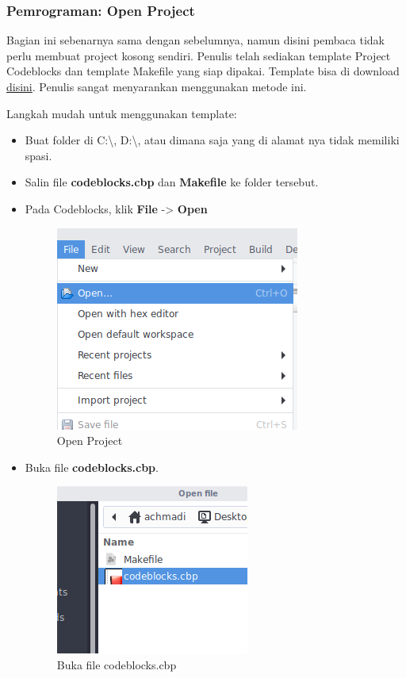 \documentclass[12pt,]{article}
\begin{document}
	\newpage
	\subsubsection{Pemrograman: Open Project}
	
	Bagian ini sebenarnya sama dengan sebelumnya, namun disini pembaca tidak perlu membuat project kosong sendiri.
	Penulis telah sediakan template Project Codeblocks dan template Makefile yang siap dipakai.
	Template bisa di download \href{https://github.com/mekatronik-achmadi/atmega-demos/tree/master/template/codeblocks/}{disini}.
	Penulis sangat menyarankan menggunakan metode ini.
	
	Langkah mudah untuk menggunakan template:
	\begin{itemize}
		\item Buat folder di C:\textbackslash, D:\textbackslash, atau dimana saja yang di alamat nya tidak memiliki spasi.
		
		\item Salin file \textbf{codeblocks.cbp} dan \textbf{Makefile} ke folder tersebut.
		
		\item Pada Codeblocks, klik \textbf{File} -> \textbf{Open}
		
		\begin{figure}[H]
			\centering
			\includegraphics[width=0.5\linewidth]{images/cbp_0}
			\caption{Open Project}
		\end{figure}
	
		\item Buka file \textbf{codeblocks.cbp}.
		
		\begin{figure}[H]
			\centering
			\includegraphics[width=0.5\linewidth]{images/cbp_1}
			\caption{Buka file codeblocks.cbp}
		\end{figure}
	

\end{itemize}
\end{document}
